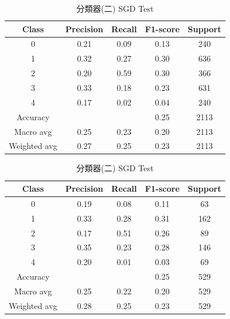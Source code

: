 \begin{enumerate}
\begin{enumerate}
            \begin{table}[H]
            \centering
            \scriptsize
            \begin{minipage}{0.48\textwidth}
            \centering
            \begin{tabular}{c|cccc}
            \hline
            Class & Precision & Recall & F1-score & Support \\
            \hline
            0 & 0.21 & 0.09 & 0.13 & 240 \\
            1 & 0.32 & 0.27 & 0.30 & 636 \\
            2 & 0.20 & 0.59 & 0.30 & 366 \\
            3 & 0.33 & 0.18 & 0.23 & 631 \\
            4 & 0.17 & 0.02 & 0.04 & 240 \\
            \hline
            Accuracy &       &       & 0.25 & 2113 \\
            Macro avg & 0.25 & 0.23 & 0.20 & 2113 \\
            Weighted avg & 0.27 & 0.25 & 0.23 & 2113 \\
            \hline
            \end{tabular}
            \caption{分類器(二) SGD Train}
            \label{tab:classifier_2_report_train_logreg_sgd_filtered}
            \end{minipage}%
            \hfill
            \begin{minipage}{0.48\textwidth}
            \centering
            \begin{tabular}{c|cccc}
            \hline
            Class & Precision & Recall & F1-score & Support \\
            \hline
            0 & 0.19 & 0.08 & 0.11 & 63 \\
            1 & 0.33 & 0.28 & 0.31 & 162 \\
            2 & 0.17 & 0.51 & 0.26 & 89 \\
            3 & 0.35 & 0.23 & 0.28 & 146 \\
            4 & 0.20 & 0.01 & 0.03 & 69 \\
            \hline
            Accuracy &       &       & 0.25 & 529 \\
            Macro avg & 0.25 & 0.22 & 0.20 & 529 \\
            Weighted avg & 0.28 & 0.25 & 0.23 & 529 \\
            \hline
            \end{tabular}
            \caption{分類器(二) SGD Test}
            \label{tab:classifier_2_report_test_logreg_sgd_filtered}
            \end{minipage}
            \end{table}



\end{enumerate}
\end{enumerate}
